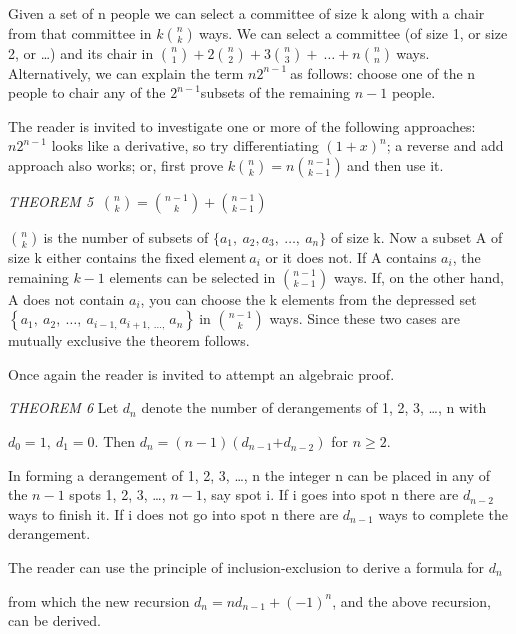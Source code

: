 \documentclass[10pt,letter]{article}
\begin{document}
Given a set of n people we can select a committee of size k along with a
chair from that committee in \(k
\binom{n}{k}
\ \)ways. We can select a committee (of size 1, or size 2,
or \ldots{}) and its chair in \(\binom{n}{1}
 + 2
\binom{n}{2}
 + 3
\binom{n}{3}
 + \ \ldots + n
\binom{n}{n}
\ \)ways. Alternatively, we can explain the term
\(n2^{n - 1}\ \)as follows: choose one of the n people to chair any of
the \(2^{n - 1}\)subsets of the remaining \(n - 1\) people.

The reader is invited to investigate one or more of the following
approaches: \(n2^{n - 1}\) looks like a derivative, so try
differentiating \(\left( 1 + x \right)^{n}\); a reverse and add approach
also works; or, first prove \(k
\binom{n}{k}
 = n
\binom{n - 1}{k - 1}
\ \)and then use it.

\emph{THEOREM 5} \(\
\binom{n}{k}
 =
\binom{n - 1}{k}
 +
\binom{n - 1}{k - 1}
\)

\(\binom{n}{k}
\ \)is the number of subsets of
\(\{ a_{1},\ a_{2},a_{3},\ \ldots,\ a_{n}\}\) of size k. Now a subset A
of size k either contains the fixed element\(\ a_{i}\) or it does not.
If A contains \(a_{i}\), the remaining \(k - 1\) elements can be
selected in \(\binom{n - 1}{k - 1}
\) ways. If, on the other hand, A does not contain
\(a_{i}\), you can choose the k elements from the depressed set
\(\left\{ a_{1},\ a_{2},\ \ldots,\ a_{i - 1,}a_{i + 1,\ \ldots,\ }a_{n} \right\}\ \)in
\(\binom{n - 1}{k}
\) ways. Since these two cases are mutually exclusive the
theorem follows.

Once again the reader is invited to attempt an algebraic proof.

\emph{THEOREM 6} Let \(d_{n}\) denote the number of derangements of 1,
2, 3, \ldots{}, n with

\(d_{0} = 1,\ d_{1} = 0.\) Then
\(d_{n} = \left( n - 1 \right)(d_{n - 1}{+ d}_{n - 2})\) for
\(n \geq 2\).

In forming a derangement of 1, 2, 3, \ldots{}, n the integer n can be
placed in any of the \(n - 1\) spots 1, 2, 3, \ldots{}, \(n - 1\), say
spot i. If i goes into spot n there are \(d_{n - 2}\) ways to finish it.
If i does not go into spot n there are \(d_{n - 1}\) ways to complete
the derangement.

The reader can use the principle of inclusion-exclusion to derive a
formula for \(d_{n}\)

from which the new recursion
\(d_{n} = nd_{n - 1} + \left( - 1 \right)^{n}\), and the above
recursion, can be derived.
\end{document}
